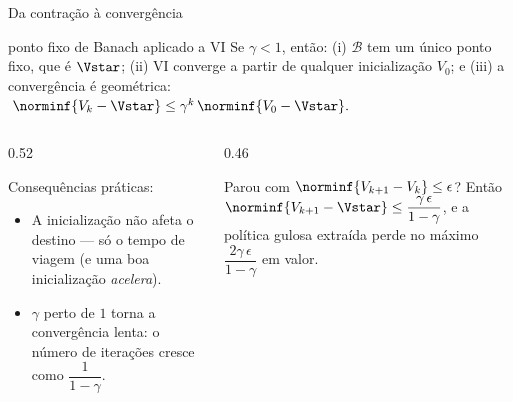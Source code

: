 \documentclass[aspectratio=169, 11pt]{beamer}
\newcommand{\Bop}{\mathcal{B}}                 %
\begin{document}
\begin{frame}{Da contração à convergência}
  \begin{teobox}{ponto fixo de Banach aplicado a VI}
    Se $\gamma<1$, então: (i) $\Bop$ tem um \alert{único} ponto fixo, que é $\Vstar$;
    (ii) VI converge a partir de \alert{qualquer} inicialização $V_0$; e (iii) a
    convergência é geométrica:
    \(\; \norminf{V_k - \Vstar} \le \gamma^k\, \norminf{V_0 - \Vstar}. \)
  \end{teobox}
  \begin{columns}[T]
    \begin{column}{0.52\textwidth}
      {\small Consequências práticas:
      \begin{itemize}\setlength{\itemsep}{0.3ex}
        \item A inicialização não afeta o destino --- só o tempo de viagem (e uma boa
              inicialização \emph{acelera}).
        \item $\gamma$ perto de $1$ torna a convergência lenta: o número de iterações
              cresce como $\dfrac{1}{1-\gamma}$.
      \end{itemize}}
    \end{column}
    \begin{column}{0.46\textwidth}
      \begin{ideiabox}
        Parou com $\norminf{V_{k+1}-V_k} \le \epsilon$? Então
        $\norminf{V_{k+1} - \Vstar} \le \dfrac{\gamma\,\epsilon}{1-\gamma}$, e a política
        gulosa extraída perde no máximo $\dfrac{2\gamma\,\epsilon}{1-\gamma}$ em valor.
      \end{ideiabox}
    \end{column}
  \end{columns}
\end{frame}
\end{document}
